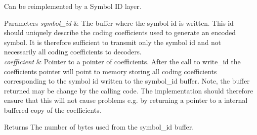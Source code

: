 Can be reimplemented by a Symbol I\-D layer. 


\begin{DoxyParams}{Parameters}
{\em symbol\-\_\-id} & The buffer where the symbol id is written. This id should uniquely describe the coding coefficients used to generate an encoded symbol. It is therefore sufficient to transmit only the symbol id and not necessarily all coding coefficients to decoders. \\
\hline
{\em coefficient} & Pointer to a pointer of coefficients. After the call to write\-\_\-id the coefficients pointer will point to memory storing all coding coefficients corresponding to the symbol id written to the symbol\-\_\-id buffer. Note, the buffer returned may be change by the calling code. The implementation should therefore ensure that this will not cause problems e.\-g. by returning a pointer to a internal buffered copy of the coefficients.\\
\hline
\end{DoxyParams}
\begin{DoxyReturn}{Returns}
The number of bytes used from the symbol\-\_\-id buffer. 
\end{DoxyReturn}
